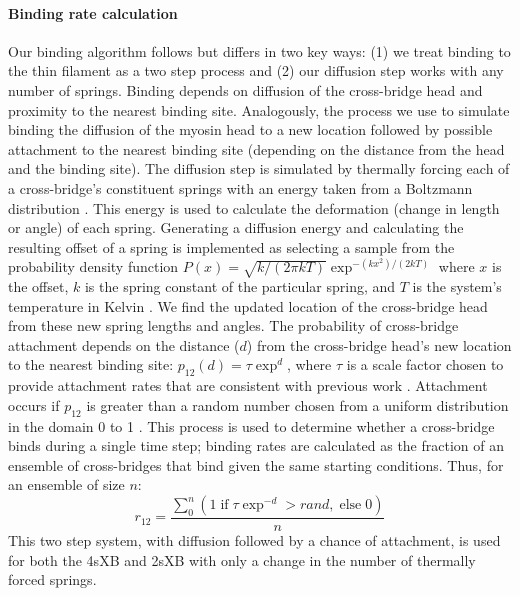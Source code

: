 \documentclass[]{article}
\begin{document}
\paragraph{Binding rate calculation} %
Our binding algorithm follows \citet{Tanner2007} but differs in two key ways: (1) we treat binding to the thin filament as a two step process and (2) our diffusion step works with any number of springs.
Binding depends on diffusion of the cross-bridge head and proximity to the nearest binding site.
Analogously, the process we use to simulate binding the diffusion of the myosin head to a new location followed by possible attachment to the nearest binding site (depending on the distance from the head and the binding site).
The diffusion step is simulated by thermally forcing each of a cross-bridge's constituent springs with an energy taken from a Boltzmann distribution \citep{BergBook, HowardBook}.
This energy is used to calculate the deformation (change in length or angle) of each spring. 
Generating a diffusion energy and calculating the resulting offset of a spring is implemented as selecting a sample from the probability density function $P(x) = \sqrt{k / (2 \pi kT)} \exp^{-(k x^2)/(2 kT)}$ where $x$ is the offset, $k$ is the spring constant of the particular spring, and $T$ is the system's temperature in Kelvin  \citep{DillBook, HowardBook}. %
We find the updated location of the cross-bridge head from these new spring lengths and angles.
The probability of cross-bridge attachment depends on the distance ($d$) from the cross-bridge head's new location to the nearest binding site: $p_{12}(d) = \tau \exp ^{d}$, where $\tau$ is a scale factor chosen to provide attachment rates that are consistent with previous work \citep{Daniel1998, Tanner2007}.
Attachment occurs if $p_{12}$ is greater than a random number chosen from a uniform distribution in the domain 0 to 1 \citep{Tanner2007}.
This process is used to determine whether a cross-bridge binds during a single time step; binding rates are calculated as the fraction of an ensemble of cross-bridges that bind given the same starting conditions. 
Thus, for an ensemble of size $n$: 
$$r_{12} =  \frac{\sum_0^n \left( 1\; \textrm{if}\; \tau \exp^{-d}>rand ,\; \textrm{else}\; 0 \right)}{n}$$
This two step system, with diffusion followed by a chance of attachment, is used for both the 4sXB and 2sXB with only a change in the number of thermally forced springs.
\end{document}
